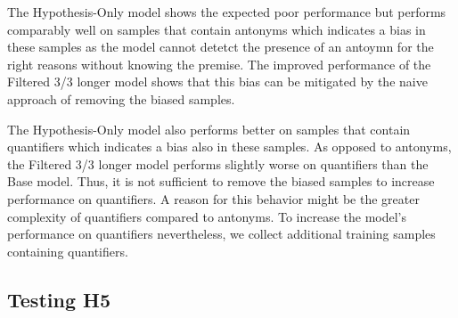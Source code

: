 The Hypothesis-Only model shows the expected poor performance but performs comparably well on samples that contain antonyms which indicates a bias in these samples as the model cannot detetct the presence of an antoymn for the right reasons without knowing the premise. The improved performance of the Filtered 3/3 longer model shows that this bias can be mitigated by the naive approach of removing the biased samples.

The Hypothesis-Only model also performs better on samples that contain quantifiers which indicates a bias also in these samples. As opposed to antonyms, the Filtered 3/3 longer model performs slightly worse on quantifiers than the Base model. Thus, it is not sufficient to remove the biased samples to increase performance on quantifiers. A reason for this behavior might be the greater complexity of quantifiers compared to antonyms. To increase the model's performance on quantifiers nevertheless, we collect additional training samples containing quantifiers.

\subsection{Testing H5}
